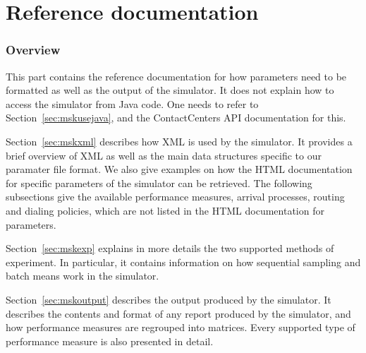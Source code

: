 \part{Reference documentation}
\section{Overview}
\label{sec:mskref}

This part contains the reference documentation for how parameters
need to be formatted as well as the output of the
simulator.  It
does not explain how to access the simulator from Java code.  One
needs to refer to Section~\ref{sec:mskusejava}, and
the ContactCenters API documentation for this.

Section~\ref{sec:mskxml} describes how XML is used by the simulator.
It provides a brief overview of XML as well as the main data
structures specific to our paramater file format.
We also give examples on how the HTML documentation for specific
parameters of the simulator can be retrieved.
The following subsections
give the available performance measures,
arrival processes, routing and dialing policies,
which are not listed in the HTML documentation for parameters.



Section~\ref{sec:mskexp} explains in more details the two supported
methods of experiment. In particular, it contains information on how
sequential sampling and batch means work in the simulator.

Section~\ref{sec:mskoutput} describes the output produced by the
simulator.  It describes the contents and format of any report
produced by the simulator, and how performance measures are regrouped
into matrices.  Every supported type of performance measure is also
presented in detail.
